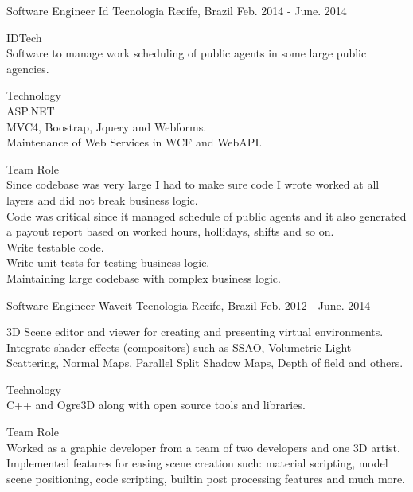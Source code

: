 \begin{cventries}
  \cventry
    {Software Engineer} %
    {Id Tecnologia} %
    {Recife, Brazil} %
    {Feb. 2014 - June. 2014} %
    {
      \begin{cvitems} %
\item{IDTech\\
Software to manage work scheduling of public agents in some large public agencies.\\
}
\item{Technology\\
ASP.NET\\
MVC4, Boostrap, Jquery and Webforms.\\
Maintenance of Web Services in WCF and WebAPI.\\
}
\item{Team Role\\
Since codebase was very large I had to make sure code I wrote worked at all layers and did not break business logic.\\ 
Code was critical since it managed schedule of public agents and it also generated a payout report based on worked hours, hollidays, shifts and so on.\\
Write testable code.\\
Write unit tests for testing business logic.\\
Maintaining large codebase with complex business logic.\\
}
      \end{cvitems}
    }

  \cventry
    {Software Engineer} %
    {Waveit Tecnologia} %
    {Recife, Brazil} %
    {Feb. 2012 - June. 2014} %
    {
      \begin{cvitems} %
\item{3D Scene editor and viewer for creating and presenting virtual environments.\\
Integrate shader effects (compositors) such as SSAO, Volumetric Light Scattering, Normal Maps, Parallel Split Shadow Maps, Depth of field and others.
}
\item{Technology\\
C++ and Ogre3D along with open source tools and libraries.
}
\item{Team Role\\
Worked as a graphic developer from a team of two developers and one 3D artist. Implemented features for easing scene creation such: material scripting, model scene positioning, code scripting, builtin post processing features and much more.\\
}
      \end{cvitems}
    }


\end{cventries}
